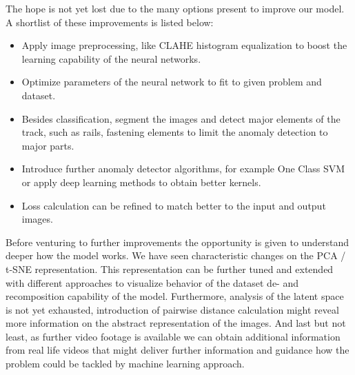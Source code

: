 The hope is not yet lost due to the many options present to improve our model.
A shortlist of these improvements is listed below:
\begin{itemize}
      \item Apply image preprocessing, like CLAHE histogram equalization to boost the learning
            capability of the neural networks.
      \item Optimize parameters of the neural network to fit to given problem and dataset.
      \item Besides classification, segment the images and detect major elements of the track,
            such as rails, fastening elements to limit the anomaly detection to major parts.
      \item Introduce further anomaly detector algorithms, for example One Class SVM or apply
            deep learning methods to obtain better kernels.
      \item Loss calculation can be refined to match better to the input and output images.
\end{itemize}

Before venturing to further improvements the opportunity is given to understand deeper how the
model works.
We have seen characteristic changes on the PCA / t-SNE representation.
This representation can be further tuned and extended with different approaches to visualize behavior
of the dataset de- and recomposition capability of the model.
Furthermore, analysis of the latent space is not yet exhausted, introduction of pairwise distance
calculation might reveal more information on the abstract representation of the images.
And last but not least, as further video footage is available we can obtain additional information
from real life videos that might deliver further information and guidance how the problem could
be tackled by machine learning approach.